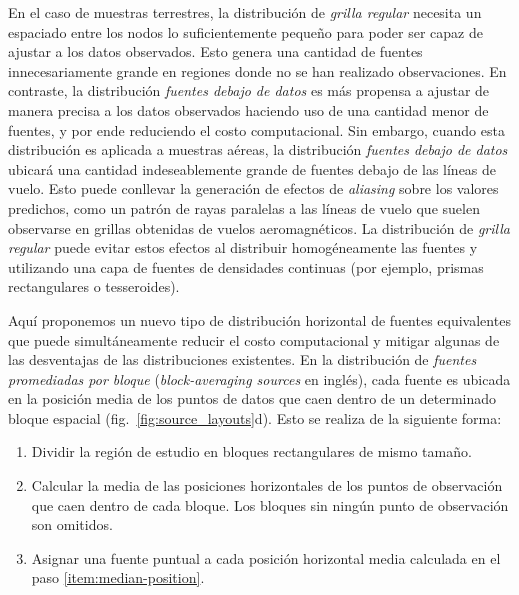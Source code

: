 En el caso de muestras terrestres, la distribución de \emph{grilla regular}
necesita un espaciado entre los nodos lo suficientemente pequeño para poder ser
capaz de ajustar a los datos observados.
Esto genera una cantidad de fuentes innecesariamente grande en regiones donde
no se han realizado observaciones.
En contraste, la distribución \emph{fuentes debajo de datos} es más propensa
a ajustar de manera precisa a los datos observados haciendo uso de una cantidad
menor de fuentes, y por ende reduciendo el costo computacional.
Sin embargo, cuando esta distribución es aplicada a muestras aéreas, la
distribución \emph{fuentes debajo de datos} ubicará una cantidad
indeseablemente grande de fuentes debajo de las líneas de vuelo.
Esto puede conllevar la generación de efectos de \emph{aliasing} sobre los
valores predichos, como un patrón de rayas paralelas a las líneas de vuelo que
suelen observarse en grillas obtenidas de vuelos aeromagnéticos.
La distribución de \emph{grilla regular} puede evitar estos efectos al
distribuir homogéneamente las fuentes y utilizando una capa de fuentes de
densidades continuas (por ejemplo, prismas rectangulares o tesseroides).

Aquí proponemos un nuevo tipo de distribución horizontal de fuentes
equivalentes que puede simultáneamente reducir el costo computacional y mitigar
algunas de las desventajas de las distribuciones existentes.
En la distribución de \emph{fuentes promediadas por bloque}
(\emph{block-averaging sources} en inglés), cada fuente es ubicada en la
posición media de los puntos de datos que caen dentro de un determinado bloque
espacial (fig.~\ref{fig:source_layouts}d).
Esto se realiza de la siguiente forma:

\begin{enumerate}
    \item Dividir la región de estudio en bloques rectangulares de mismo
        tamaño.
    \item \label{item:median-position} Calcular la media de las posiciones
        horizontales de los puntos de observación que caen dentro de cada
        bloque. Los bloques sin ningún punto de observación son omitidos.
    \item Asignar una fuente puntual a cada posición horizontal media calculada
        en el paso \ref{item:median-position}.
\end{enumerate}

